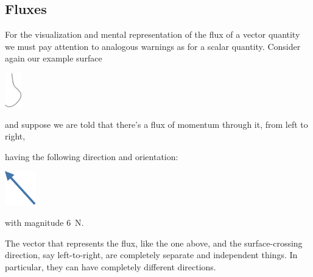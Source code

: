 \documentclass[a4paper,12pt,%
onecolumn,oneside,titlepage,%
british%
]{memoir}
\renewcommand*{\|}[1][]{\nonscript\:#1\vert\nonscript\:\mathopen{}}
\begin{document}
\bigskip

\subsection{Fluxes}

For the visualization and mental representation of the flux of a vector quantity we must pay attention to analogous warnings as for a scalar quantity. Consider again our example surface
\begin{center}
  \includegraphics[height=4em]{fluxsurface.pdf}
\end{center}
and suppose we are told that there's a flux of momentum through it, from left to right, {having the following direction and orientation:\noprelistbreak%
\begin{center}
  \includegraphics[height=4em]{vec_NW.pdf}
\end{center}
}
\noindent with magnitude \textcolor{bluepurple}{\qty{6}{N}}.

\begin{warning}
  The vector that represents the flux, like the one above, and the surface-crossing direction, say left-to-right, are completely separate and independent things. In particular, they can have completely different directions.
\end{warning}

\smallskip
\end{document}
